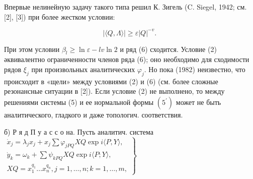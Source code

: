 \documentclass[10pt]{article}
\begin{document}
Впервые нелинейную задачу такого типа решил К. Зигель (C. Siegel, 1942; см. [2], [3]) при более жестком условии:



\[

|\langle Q, \Lambda\rangle| \geqslant \varepsilon|Q|^{-v} \text {. }

\]



При этом условии $\beta_{l} \geqslant \ln \varepsilon-l v \ln 2$ и ряд (6) сходится. Условие (2) әквивалентно ограниченности членов ряда (6); оно необходимо для сходимости рядов $\xi_{j}$ при произвольных аналитических $\varphi_{j}$. Но пока (1982) неизвестно, что происходит в «щели» между условиями (2) и (6) (см. более сложные резонансные ситуации в [2]). Если условие (2) не выполнено, то между решениями системы (5) и ее нормальной формы $\left(5^{\prime}\right)$ может не быть аналитического, гладкого и даже топологич. соответствия.



б) Р я д П у а с с о на. Пусть аналитич. система $\left.\begin{array}{l}\dot{x}_{j}=\lambda_{j} x_{j}+x_{j} \sum \varphi_{j P Q} X Q \exp i\langle P, Y\rangle, \\ \dot{y}_{k}=\omega_{k}+\sum \psi_{k P Q} X Q \exp i\langle P ; Y\rangle, \\ X Q=x_{1}^{q_{1}} \ldots x_{n}^{q_{n}}, j=1, \ldots, n ; k=1, \ldots, m,\end{array}\right\}$
\end{document}
